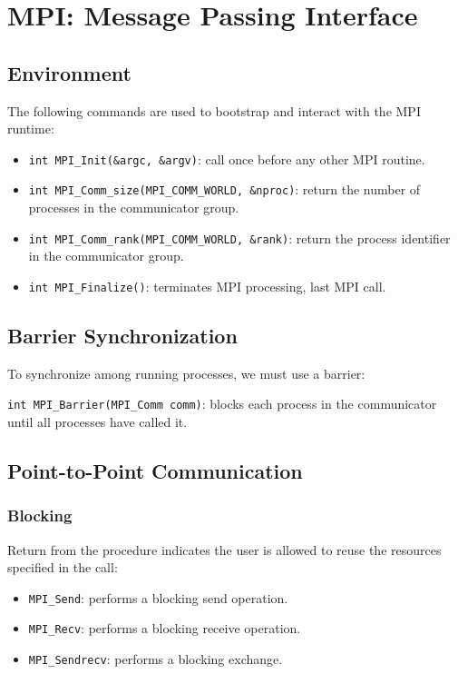\section{MPI: Message Passing Interface}

\subsection{Environment}
The following commands are used to bootstrap and interact with the MPI runtime:
\begin{itemize}
    \item \texttt{int MPI\_Init(\&argc, \&argv)}: call once before any other MPI routine.
    \item \texttt{int MPI\_Comm\_size(MPI\_COMM\_WORLD, \&nproc)}: return the number of processes in the communicator group.
    \item \texttt{int MPI\_Comm\_rank(MPI\_COMM\_WORLD, \&rank)}: return the process identifier in the communicator group.
    \item \texttt{int MPI\_Finalize()}: terminates MPI processing, last MPI call.
\end{itemize}

\subsection{Barrier Synchronization}
To synchronize among running processes, we must use a barrier:

\texttt{int MPI\_Barrier(MPI\_Comm comm)}: blocks each process in the communicator until all processes have called it.

\subsection{Point-to-Point Communication}

\subsubsection*{Blocking}
Return from the procedure indicates the user is allowed to reuse the resources specified in the call:
\begin{itemize}
    \item \texttt{MPI\_Send}: performs a blocking send operation.
    \item \texttt{MPI\_Recv}: performs a blocking receive operation.
    \item \texttt{MPI\_Sendrecv}: performs a blocking exchange.
\end{itemize}

